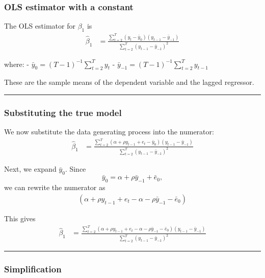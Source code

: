 \documentclass[11pt]{article}
\begin{document}
\subsubsection{OLS estimator with a
constant}\label{ols-estimator-with-a-constant}

The OLS estimator for \(\beta_1\) is \[
\begin{aligned}
\hat\beta_{1}
&= \frac{\sum_{t=2}^{T} (y_t-\bar y_0)(y_{t-1}-\bar y_{-1})}
{\sum_{t=2}^{T} (y_{t-1}-\bar y_{-1})^2}
\end{aligned}
\]

where: - \(\bar y_0 = (T-1)^{-1}\sum_{t=2}^T y_t\) -
\(\bar y_{-1} = (T-1)^{-1}\sum_{t=2}^T y_{t-1}\)

These are the sample means of the dependent variable and the lagged
regressor.

\begin{center}\rule{0.5\linewidth}{0.5pt}\end{center}

\subsubsection{Substituting the true
model}\label{substituting-the-true-model}

We now substitute the data generating process into the numerator: \[
\begin{aligned}
\hat\beta_{1}
&= \frac{\sum_{t=2}^{T} (\alpha+\rho y_{t-1}+e_t-\bar y_0)(y_{t-1}-\bar y_{-1})}
{\sum_{t=2}^{T} (y_{t-1}-\bar y_{-1})^2}
\end{aligned}
\]

Next, we expand \(\bar y_0\). Since \[
\bar y_0 = \alpha + \rho \bar y_{-1} + \bar e_0,
\] we can rewrite the numerator as \[
\begin{aligned}
(\alpha+\rho y_{t-1}+e_t-\alpha-\rho \bar y_{-1}-\bar e_0)
\end{aligned}
\]

This gives \[
\begin{aligned}
\hat\beta_{1}
&= \frac{\sum_{t=2}^{T} (\alpha+\rho y_{t-1}+e_t-\alpha-\rho \bar y_{-1}-\bar e_0)(y_{t-1}-\bar y_{-1})}
{\sum_{t=2}^{T} (y_{t-1}-\bar y_{-1})^2}
\end{aligned}
\]

\begin{center}\rule{0.5\linewidth}{0.5pt}\end{center}

\subsubsection{Simplification}\label{simplification}
\end{document}
